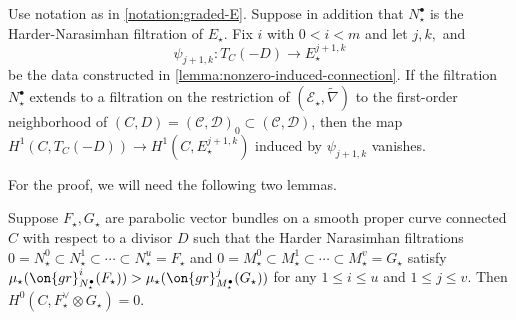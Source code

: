 %
%
\begin{lemma}
\notready
	\label{proposition:filtered-h1-map}
	Use notation as in \autoref{notation:graded-E}. Suppose in addition that $N_\star^\bullet$ is the Harder-Narasimhan filtration of $E_\star$. Fix $i$ with $0<i<m$ and let $j,k,$ and $$\psi_{j+1, k}: T_C(-D)\to E_\star^{j+1,k}$$ be the data constructed in \autoref{lemma:nonzero-induced-connection}. If the filtration $N_\star^\bullet$ extends to a filtration on the restriction of
$(\mathscr E_\star,\widetilde{\nabla} )$ to the first-order neighborhood of $(C,D)=(\mathscr{C}, \mathscr{D})_0\subset (\mathscr{C}, \mathscr{D})$,
then the map
$H^1(C, T_C(-D))\to H^1(C, E_\star^{j+1,k})$
	induced by $\psi_{j+1, k}$
vanishes.
\end{lemma}
For the proof, we will need the following two  lemmas.
\begin{lemma}
\notready
	\label{lemma:hn-sections-vanishing}
	Suppose $F_\star, G_\star$ are parabolic vector bundles on a smooth
	proper curve connected $C$ with respect to a divisor $D$
	such that the Harder Narasimhan filtrations $0 = N^0_\star \subset N^1_\star
	\subset \cdots \subset N^u_\star= F_\star$ and
	$0 = M^0_\star \subset M^1_\star
	\subset \cdots \subset M^v_\star= G_\star$
	satisfy
 $\mu_\star(\on{gr}_{N_\star^\bullet}^i(F_\star)) >
\mu_\star(\on{gr}_{M_\star^\bullet}^j(G_\star))$
for any $1 \leq i \leq u$ and $1 \leq j \leq v$.
Then $H^0(C, F_\star^\vee \otimes G_\star) = 0$.
\end{lemma}
